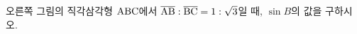 \noindent\begin{minipage}[t]{0.58\linewidth}\vspace{0pt}\raggedright 오른쪽 그림의 직각삼각형 $\mathrm{ABC}$에서 $\overline{\mathrm{AB}}:\overline{\mathrm{BC}}=1:\sqrt{3}$일 때, $\sin B$의 값을 구하시오.\end{minipage}\hfill\begin{minipage}[t]{0.4\linewidth}\vspace{0pt}\centering \resizebox{\ifdim\width>\linewidth\linewidth\else\width\fi}{!}{}\end{minipage}\par
